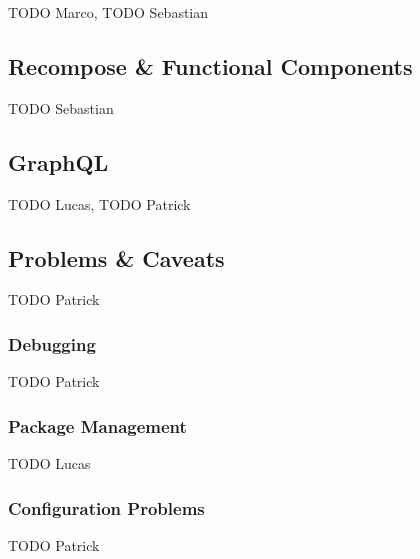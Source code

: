 TODO Marco, TODO Sebastian

\subsection{Recompose \& Functional Components}
\label{ssec:recompose}

TODO Sebastian

\subsection{GraphQL}
\label{ssec:graphql}

TODO Lucas, TODO Patrick

\subsection{Problems \& Caveats}
\label{ssec:problems}

TODO Patrick

\subsubsection{Debugging}
\label{sssec:debugging}

TODO Patrick

\subsubsection{Package Management}
\label{sssec:package_management}

TODO Lucas

\subsubsection{Configuration Problems}
\label{sssec:configuration_problems}

TODO Patrick